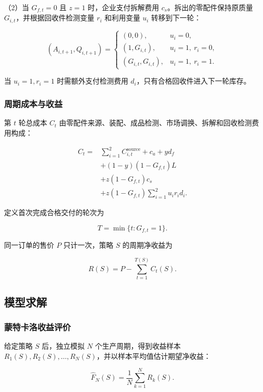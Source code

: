 \documentclass{cumcm}
\numberwithin{figure}{section}
\numberwithin{table}{section}
\begin{document}
（2）当 \(G_{f,t}=0\) 且 \(z=1\) 时，企业支付拆解费用 \(c_s\)。拆出的零配件保持原质量 \(G_{i,t}\)，并根据回收件检测变量 \(r_i\) 和利用变量 \(u_i\) 转移到下一轮：

\[
(A_{i,t+1},Q_{i,t+1})=
\begin{cases}
(0,0),&u_i=0,\\
(1,G_{i,t}),&u_i=1,\ r_i=0,\\
(G_{i,t},G_{i,t}),&u_i=1,\ r_i=1.
\end{cases}
\]

当 \(u_i=1,r_i=1\) 时需额外支付检测费用 \(d_i\)，只有合格回收件进入下一轮库存。

\subsubsection{周期成本与收益}\label{ux5468ux671fux6210ux672cux4e0eux6536ux76ca}

第 \(t\) 轮总成本 \(C_t\) 由零配件来源、装配、成品检测、市场调换、拆解和回收检测费用构成：

\[
\begin{aligned}
C_t={}&\sum_{i=1}^{2}C_{i,t}^{\mathrm{source}}+c_a+yd_f\\
&+(1-y)(1-G_{f,t})L\\
&+z(1-G_{f,t})c_s\\
&+z(1-G_{f,t})\sum_{i=1}^{2}u_ir_id_i.
\end{aligned}
\]

定义首次完成合格交付的轮次为

\[
T=\min\{t:G_{f,t}=1\}.
\]

同一订单的售价 \(P\) 只计一次，策略 \(S\) 的周期净收益为

\[
R(S)=P-\sum_{t=1}^{T(S)}C_t(S).
\]

\subsection{模型求解}\label{ux6a21ux578bux6c42ux89e3}

\subsubsection{蒙特卡洛收益评价}\label{ux8499ux7279ux5361ux6d1bux6536ux76caux8bc4ux4ef7}

给定策略 \(S\) 后，独立模拟 \(N\) 个生产周期，得到收益样本 \(R_1(S),R_2(S),\ldots,R_N(S)\)，并以样本平均值估计期望净收益：

\[
\widehat F_N(S)=\frac{1}{N}\sum_{k=1}^{N}R_k(S).
\]
\end{document}
